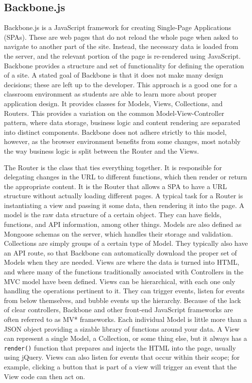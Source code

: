 \documentclass[12pt]{article}
\newcommand{\code}[1]{{\texttt {#1}}}
\begin{document}
\subsection{Backbone.js}\label{sec:backbone}
Backbone.js\cite{Backbone} is a JavaScript framework for creating Single-Page Applications (SPAs). These are web pages that do not reload the whole page when asked to navigate to another part of the site. Instead, the necessary data is loaded from the server, and the relevant portion of the page is re-rendered using JavaScript. Backbone provides a structure and set of functionality for defining the operation of a site. A stated goal of Backbone is that it does not make many design decisions; these are left up to the developer. This approach is a good one for a classroom environment as students are able to learn more about proper application design. It provides classes for Models, Views, Collections, and Routers. This provides a variation on the common Model-View-Controller pattern, where data storage, business logic and content rendering are separated into distinct components. Backbone does not adhere strictly to this model, however, as the browser environment benefits from some changes, most notably the way business logic is split between the Router and the Views.

The Router is the class that ties everything together. It is responsible for delegating changes in the URL to different functions, which then render or return the appropriate content. It is the Router that allows a SPA to have a URL structure without actually loading different pages. A typical task for a Router is instantiating a view and passing it some data, then rendering it into the page. A model is the raw data structure of a certain object. They can have fields, functions, and API information, among other things.  Models are also defined as Mongoose schemas on the server, which handles their storage and validation. Collections are simply groups of a certain type of Model. They typically also have an API route, so that Backbone can automatically download the proper set of Models when they are needed. Views are where the data is turned into HTML, and where many of the functions traditionally associated with Controllers in the MVC model have been defined. Views can be hierarchical, with each one only handling the operations pertinent to it. They can trigger events, listen for events from below themselves, and bubble events up the hierarchy. Because of the lack of clear controllers, Backbone and other front-end JavaScript frameworks are often referred to as MV* frameworks. Each individual Model is little more than a JSON object providing a sizable library of functions around your data. A View can represent a single Model, a Collection, or some thing else, but it always has a \code{render()} function that prepares and injects the HTML into the page, usually using jQuery. Views can also listen for events that occur within their scope; for example, clicking a button that is part of a view will trigger an event that the View code can then act on. 
\end{document}
